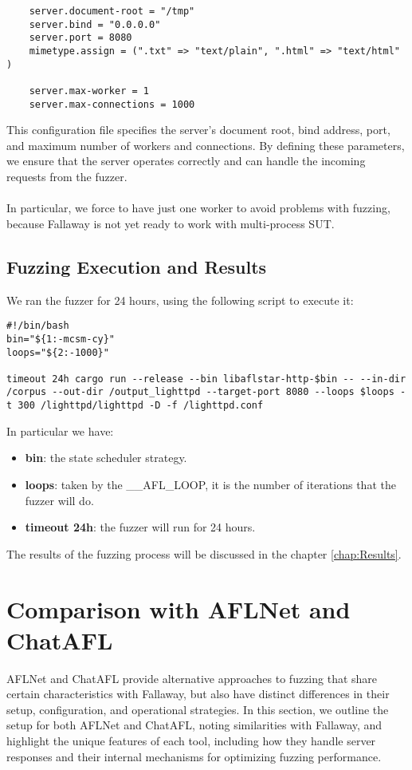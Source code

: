 \begin{lstlisting}
    server.document-root = "/tmp"
    server.bind = "0.0.0.0"
    server.port = 8080
    mimetype.assign = (".txt" => "text/plain", ".html" => "text/html" )

    server.max-worker = 1 
    server.max-connections = 1000
\end{lstlisting}
This configuration file specifies the server's document root, bind address, port, and maximum number of workers and connections. By defining these parameters, we ensure that the server operates correctly and can handle the incoming requests from the fuzzer.
\\\\In particular, we force to have just one worker to avoid problems with fuzzing, because Fallaway is not yet ready to work with multi-process SUT.
\subsection{Fuzzing Execution and Results}

We ran the fuzzer for 24 hours, using the following script to execute it:

\begin{lstlisting}
#!/bin/bash
bin="${1:-mcsm-cy}"
loops="${2:-1000}"

timeout 24h cargo run --release --bin libaflstar-http-$bin -- --in-dir /corpus --out-dir /output_lighttpd --target-port 8080 --loops $loops -t 300 /lighttpd/lighttpd -D -f /lighttpd.conf
\end{lstlisting}
In particular we have:
\begin{itemize}
    \item \textbf{bin}: the state scheduler strategy.
    \item \textbf{loops}: taken by the \_\_AFL\_LOOP, it is the number of iterations that the fuzzer will do.
    \item \textbf{timeout 24h}: the fuzzer will run for 24 hours.
\end{itemize}
The results of the fuzzing process will be discussed in the chapter \ref{chap:Results}.

\section{Comparison with AFLNet and ChatAFL}

AFLNet and ChatAFL provide alternative approaches to fuzzing that share certain characteristics with Fallaway, but also have distinct differences in their setup, configuration, and operational strategies. In this section, we outline the setup for both AFLNet and ChatAFL, noting similarities with Fallaway, and highlight the unique features of each tool, including how they handle server responses and their internal mechanisms for optimizing fuzzing performance.

